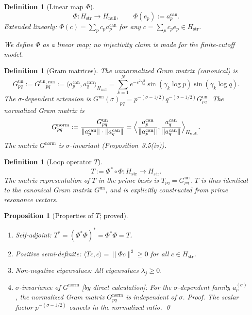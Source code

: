 \documentclass[11pt]{article}
\newtheorem{proposition}[theorem]{Proposition}
\newtheorem{definition}[theorem]{Definition}
\newcommand{\Hstr}{H_{\mathrm{str}}}
\newcommand{\Hnull}{H_{\mathrm{null}}}
\newcommand{\Gun}{G^{\mathrm{un}}}
\newcommand{\Gnorm}{G^{\mathrm{norm}}}
\newcommand{\acan}{a_p^{\mathrm{can}}}
\begin{document}
\begin{definition}[Linear map $\Phi$]
\[
\Phi\colon\Hstr\to\Hnull,\qquad\Phi(e_p):=\acan.
\]
Extended linearly: $\Phi(c)=\sum_p c_p\acan$ for any
$c=\sum_p c_p e_p\in\Hstr$.

\emph{We define $\Phi$ as a linear map; no injectivity claim is made for the
finite-cutoff model.}
\end{definition}

\begin{definition}[Gram matrices]
The \emph{unnormalized Gram matrix} (canonical) is
\[
\Gun_{pq} := \Gun{}^{\mathrm{,can}}_{pq}
:= \langle\acan,a_q^{\mathrm{can}}\rangle_{\Hnull}
= \sum_{k=1}^N e^{-\varepsilon^2\gamma_k^2}\sin(\gamma_k\log p)\sin(\gamma_k\log q).
\]
The $\sigma$-dependent extension is
$\Gun(\sigma)_{pq}=p^{-(\sigma-1/2)}q^{-(\sigma-1/2)}\Gun_{pq}$.
The \emph{normalized Gram matrix} is
\[
\Gnorm_{pq}:=\frac{\Gun_{pq}}{\|\acan\|\cdot\|a_q^{\mathrm{can}}\|}
=\Bigl\langle\frac{\acan}{\|\acan\|},\frac{a_q^{\mathrm{can}}}{\|a_q^{\mathrm{can}}\|}\Bigr\rangle_{\Hnull}.
\]
The matrix $\Gnorm$ is $\sigma$-invariant (Proposition~3.5(iv)).
\end{definition}

\begin{definition}[Loop operator $T$]
\[
T:=\Phi^*\circ\Phi\colon\Hstr\longrightarrow\Hstr.
\]
The matrix representation of $T$ in the prime basis is $T_{pq}=\Gun_{pq}$.
$T$ is thus identical to the canonical Gram matrix $\Gun$, and is explicitly
constructed from prime resonance vectors.
\end{definition}

\begin{proposition}[Properties of $T$; proved]
\label{prop:T}
\begin{enumerate}[label=\emph{(\roman*)}, leftmargin=2.2em]
\item \emph{Self-adjoint:} $T^*=(\Phi^*\Phi)^*=\Phi^*\Phi=T$.
\item \emph{Positive semi-definite:} $\langle Tc,c\rangle=\|\Phi c\|^2\geq 0$
for all $c\in\Hstr$.
\item \emph{Non-negative eigenvalues:} All eigenvalues $\lambda_j\geq 0$.
\item \emph{$\sigma$-invariance of $\Gnorm$} [by direct calculation]:
For the $\sigma$-dependent family $a_p^{(\sigma)}$, the normalized Gram matrix
$\Gnorm_{pq}$ is independent of $\sigma$. \emph{Proof.} The scalar factor
$p^{-(\sigma-1/2)}$ cancels in the normalized ratio. \qed
\end{enumerate}
\end{proposition}
\end{document}

